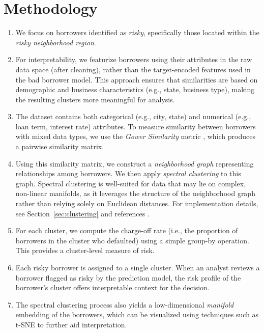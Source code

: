 \documentclass[12pt]{article}
\begin{document}
\section{Methodology}
\begin{enumerate}
    \item We focus on borrowers identified as \emph{risky}, specifically those located within the \emph{risky neighborhood region}.
    \item For interpretability, we featurize borrowers using their attributes in the raw data space (after cleaning), rather than the target-encoded features used in the bad borrower model. This approach ensures that similarities are based on demographic and business characteristics (e.g., state, business type), making the resulting clusters more meaningful for analysis.
    \item The dataset contains both categorical (e.g., city, state) and numerical (e.g., loan term, interest rate) attributes. To measure similarity between borrowers with mixed data types, we use the \emph{Gower Similarity} metric \cite{gower1971general}, which produces a pairwise similarity matrix.
    \item Using this similarity matrix, we construct a \emph{neighborhood graph} representing relationships among borrowers. We then apply \emph{spectral clustering} to this graph. Spectral clustering is well-suited for data that may lie on complex, non-linear manifolds, as it leverages the structure of the neighborhood graph rather than relying solely on Euclidean distances. For implementation details, see Section~\ref{sec:clustering} and references \cite{von2007tutorial, stat_ml_spectral_graph_theory}.
    \item For each cluster, we compute the charge-off rate (i.e., the proportion of borrowers in the cluster who defaulted) using a simple group-by operation. This provides a cluster-level measure of risk.
    \item Each risky borrower is assigned to a single cluster. When an analyst reviews a borrower flagged as risky by the prediction model, the risk profile of the borrower's cluster offers interpretable context for the decision.
    \item The spectral clustering process also yields a low-dimensional \emph{manifold} embedding of the borrowers, which can be visualized using techniques such as t-SNE \cite{maaten2008visualizing} to further aid interpretation.
\end{enumerate}
\end{document}
